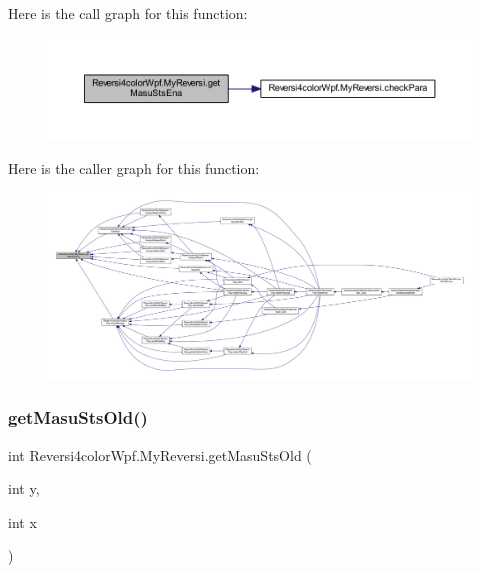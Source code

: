 Here is the call graph for this function\+:
\nopagebreak
\begin{figure}[H]
\begin{center}
\leavevmode
\includegraphics[width=350pt]{class_reversi4color_wpf_1_1_my_reversi_a9bd7042ad264b2ffaa0a69aadef6a7f9_cgraph}
\end{center}
\end{figure}
Here is the caller graph for this function\+:
\nopagebreak
\begin{figure}[H]
\begin{center}
\leavevmode
\includegraphics[width=350pt]{class_reversi4color_wpf_1_1_my_reversi_a9bd7042ad264b2ffaa0a69aadef6a7f9_icgraph}
\end{center}
\end{figure}
\mbox{\label{class_reversi4color_wpf_1_1_my_reversi_aa034cb7e21ff293bb62e8988db2f9d03}} 
\subsubsection{\texorpdfstring{get\+Masu\+Sts\+Old()}{getMasuStsOld()}}
{\footnotesize\ttfamily int Reversi4color\+Wpf.\+My\+Reversi.\+get\+Masu\+Sts\+Old (\begin{DoxyParamCaption}\item[{int}]{y,  }\item[{int}]{x }\end{DoxyParamCaption})}



